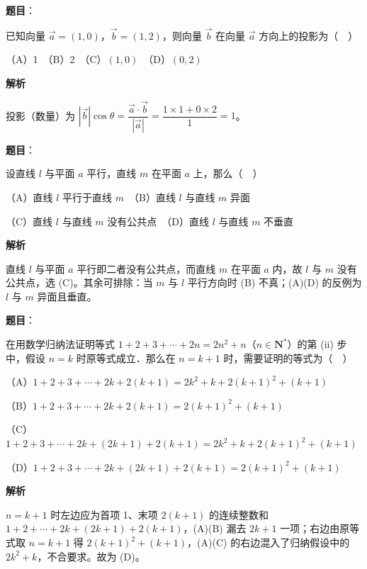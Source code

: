 \begin{answer}

\textbf{题目}：

已知向量 \(\vec{a}=(1,0)\)，\(\vec{b}=(1,2)\)，则向量 \(\vec{b}\) 在向量 \(\vec{a}\) 方向上的投影为（　）

（A）1　（B）2　（C）\((1,0)\)　（D）\((0,2)\)

\textbf{解析}

投影（数量）为 \(|\vec{b}|\cos\theta=\dfrac{\vec{a}\cdot\vec{b}}{|\vec{a}|}=\dfrac{1\times 1+0\times 2}{1}=1\)。


\end{answer}
\begin{answer}

\textbf{题目}：

设直线 \(l\) 与平面 \(a\) 平行，直线 \(m\) 在平面 \(a\) 上，那么（　）

（A）直线 \(l\) 平行于直线 \(m\)　（B）直线 \(l\) 与直线 \(m\) 异面

（C）直线 \(l\) 与直线 \(m\) 没有公共点　（D）直线 \(l\) 与直线 \(m\) 不垂直

\textbf{解析}

直线 \(l\) 与平面 \(a\) 平行即二者没有公共点，而直线 \(m\) 在平面 \(a\) 内，故 \(l\) 与 \(m\) 没有公共点，选 (C)。其余可排除：当 \(m\) 与 \(l\) 平行方向时 (B) 不真；(A)(D) 的反例为 \(l\) 与 \(m\) 异面且垂直。


\end{answer}
\begin{answer}

\textbf{题目}：

在用数学归纳法证明等式 \(1+2+3+\cdots+2n=2n^{2}+n\)（\(n\in\mathbf{N}^{*}\)）的第 (ii) 步中，假设 \(n=k\) 时原等式成立．那么在 \(n=k+1\) 时，需要证明的等式为（　）

（A）\(1+2+3+\cdots+2k+2(k+1)=2k^{2}+k+2(k+1)^{2}+(k+1)\)

（B）\(1+2+3+\cdots+2k+2(k+1)=2(k+1)^{2}+(k+1)\)

（C）\(1+2+3+\cdots+2k+(2k+1)+2(k+1)=2k^{2}+k+2(k+1)^{2}+(k+1)\)

（D）\(1+2+3+\cdots+2k+(2k+1)+2(k+1)=2(k+1)^{2}+(k+1)\)

\textbf{解析}

\(n=k+1\) 时左边应为首项 1、末项 \(2(k+1)\) 的连续整数和 \(1+2+\cdots+2k+(2k+1)+2(k+1)\)，(A)(B) 漏去 \(2k+1\) 一项；右边由原等式取 \(n=k+1\) 得 \(2(k+1)^{2}+(k+1)\)，(A)(C) 的右边混入了归纳假设中的 \(2k^{2}+k\)，不合要求。故为 (D)。


\end{answer}
